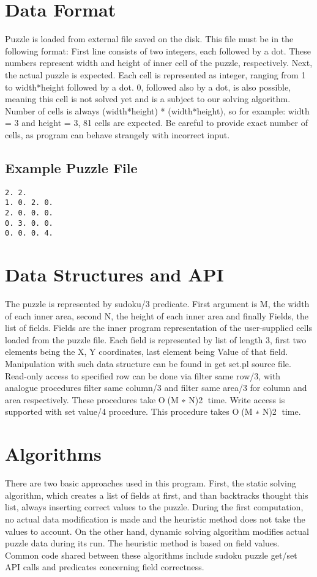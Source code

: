 \documentclass{article}
\begin{document}
\section{Data Format}
Puzzle is loaded from external file saved on the disk. This file must be in the
following format: First line consists of two integers, each followed by a dot.
These numbers represent width and height of inner cell of the puzzle,
respectively.
Next, the actual puzzle is expected. Each cell is represented as integer,
ranging from 1 to width*height followed by a dot. 0, followed also by a dot, is
also possible, meaning this cell is not solved yet and is a subject to our
solving algorithm. Number of cells is always (width*height) * (width*height),
so for example: width = 3 and height = 3, 81 cells are expected. Be careful to
provide exact number of cells, as program can behave strangely with incorrect
input.
\subsection{Example Puzzle File}
\begin{verbatim}
2. 2.
1. 0. 2. 0.
2. 0. 0. 0.
0. 3. 0. 0.
0. 0. 0. 4.
\end{verbatim}
\section{Data Structures and API}
The puzzle is represented by sudoku/3 predicate. First argument is M, the width
of each inner area, second N, the height of each inner area and finally Fields,
the list of fields. Fields are the inner program representation of the
user-supplied cells loaded from the puzzle file. Each field is represented by
list of length 3, first two elements being the X, Y coordinates, last element
being Value of that field.
Manipulation with such data structure can be found in get set.pl source file.
Read-only access to specified row can be done via filter same row/3, with
analogue procedures filter same column/3 and filter same area/3 for column and
area respectively. These procedures take O􏰈(M ∗ N)2􏰉 time.
Write access is supported with set value/4 procedure. This procedure takes O􏰈(M
∗ N)2􏰉 time.
\section{Algorithms}
There are two basic approaches used in this program. First, the static solving
algorithm, which creates a list of fields at first, and than backtracks
thought this list, always inserting correct values to the puzzle. During the
first computation, no actual data modification is made and the heuristic method
does not take the values to account.
On the other hand, dynamic solving algorithm modifies actual puzzle data during its
run. The heuristic method is based on field values.
Common code shared between these algorithms include sudoku puzzle get/set API
calls and predicates concerning field correctness.
\end{document}
